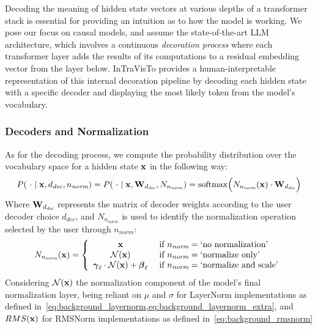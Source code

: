 Decoding the meaning of hidden state vectors at various depths of a transformer stack is essential for providing an intuition as to how the model is working.
We pose our focus on causal models, and assume the state-of-the-art LLM architecture, which involves a continuous \emph{decoration process} where each transformer layer adds the results of its computations to a residual embedding vector from the layer below.
InTraVisTo provides a human-interpretable representation of this internal decoration pipeline by decoding each hidden state with a specific decoder and displaying the most likely token from the model's vocabulary.

\subsubsection{Decoders and Normalization}\label{sssec:method_intravisto_decoding_norm}

As for the decoding process, we compute the probability distribution over the vocabulary space for a hidden state $\bm{\mathbf{x}}$ in the following way:
\begin{equation}
    \label{eq:method_intravisto_decoding}
    P(\ \cdot \mid \bm{\mathbf{x}}, d_\textit{dec}, n_\textit{norm}) = P(\ \cdot \mid \bm{\mathbf{x}}, \bm{\mathbf{W}}_{d_\textit{dec}}, N_{n_\textit{norm}}) = \operatorname{softmax}\Bigl(N_{n_\textit{norm}}(\bm{\mathbf{x}}) \cdot \bm{\mathbf{W}}_{d_\textit{dec}}\Bigr)
\end{equation}
Where $\bm{\mathbf{W}}_{d_\textit{dec}}$ represents the matrix of decoder weights according to the user decoder choice $d_\textit{dec}$, and $N_{n_\textit{norm}}$ is used to identify the normalization operation selected by the user through $n_\textit{norm}$:
\begin{equation}
    N_{n_\textit{norm}}(\bm{\mathbf{x}}) = 
    \label{eq:method_intravisto_normalization}
    \left\{
    \begin{array}{cl}
        \bm{\mathbf{x}} &\ \text{if}\ n_\textit{norm} = \text{`no normalization'} \\
        \mathcal{N}{(\bm{\mathbf{x}})} &\ \text{if}\ n_\textit{norm} = \text{`normalize only'} \\
        \bm{\mathbf{\gamma}}_\ell \cdot \mathcal{N}{(\bm{\mathbf{x}})} + \bm{\mathbf{\beta}}_\ell &\ \text{if}\ n_\textit{norm} = \text{`normalize and scale'}
    \end{array}
    \right.
\end{equation}
Considering $\mathcal{N}{(\bm{\mathbf{x}})}$ the normalization component of the model's final normalization layer, being reliant on $\mu$ and $\sigma$ for LayerNorm implementations as defined in~\cref{eq:background_layernorm,eq:background_layernorm_extra}, and $RMS(\bm{\mathbf{x}})$ for RMSNorm implementations as defined in~\cref{eq:background_rmsnorm}

